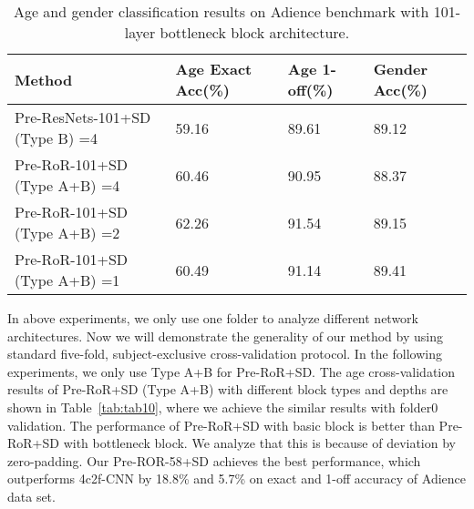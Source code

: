 \documentclass[journal]{IEEEtran}
\begin{document}
\begin{table}[h]
\caption{Age and gender classification results on Adience benchmark with 101-layer bottleneck block architecture.}
\centering
\begin{tabular}{|p{3.1cm}|p{1.5cm}|p{1.1cm}|p{1.2cm}|}
\hline
Method  &Age Exact Acc(\%)  &Age 1-off(\%) &Gender Acc(\%)  \\ 
\hline\hline
Pre-ResNets-101+SD (Type B) =4       &59.16  &89.61  &89.12  \\
\hline
Pre-RoR-101+SD  (Type A+B)  =4   &60.46  &90.95  &88.37  \\
\hline
Pre-RoR-101+SD  (Type A+B)  =2   &62.26  &91.54  &89.15  \\
\hline
Pre-RoR-101+SD  (Type A+B)  =1   &60.49  &91.14  &89.41  \\
\hline
\end{tabular}

\label{tab:tab9}
\end{table}


In above experiments, we only use one folder to analyze different network architectures. Now we will demonstrate the generality of our method by using standard five-fold, subject-exclusive cross-validation protocol. In the following experiments, we only use Type A+B for Pre-RoR+SD. The age cross-validation results of Pre-RoR+SD (Type A+B) with different block types and depths are shown in Table~\ref{tab:tab10}, where we achieve the similar results with folder0 validation. The performance of Pre-RoR+SD with basic block is better than Pre-RoR+SD with bottleneck block. We analyze that this is because of deviation by zero-padding. 
Our Pre-ROR-58+SD achieves the best performance, which outperforms 4c2f-CNN by 18.8\% and 5.7\% on exact and 1-off accuracy of Adience data set.
\end{document}

